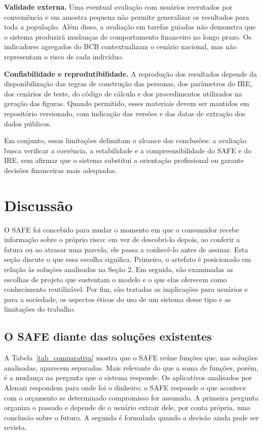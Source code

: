 \documentclass[portuguese]{sbc2025}%
\begin{document}
\textbf{Validade externa.}
Uma eventual avaliação com usuários recrutados por conveniência e
em amostra pequena não permite generalizar os resultados para toda
a população. Além disso, a avaliação em tarefas guiadas não demonstra
que o sistema produzirá mudanças de comportamento financeiro no
longo prazo. Os indicadores agregados do BCB contextualizam o cenário
nacional, mas não representam o risco de cada indivíduo.

\textbf{Confiabilidade e reprodutibilidade.}
A reprodução dos resultados depende da disponibilização das regras
de construção das personas, dos parâmetros do IRE, dos cenários de
teste, do código de cálculo e dos procedimentos utilizados na geração
das figuras. Quando permitido, esses materiais devem ser mantidos em
repositório versionado, com indicação das versões e das datas de
extração dos dados públicos.

Em conjunto, essas limitações delimitam o alcance das conclusões:
a avaliação busca verificar a coerência, a estabilidade e a
compreensibilidade do SAFE e do IRE, sem afirmar que o sistema
substitui a orientação profissional ou garante decisões financeiras
mais adequadas.

\section{Discussão}
\label{sec:discussao}

O SAFE foi concebido para mudar o momento em que o consumidor recebe informação sobre o próprio risco: em vez de descobri-lo depois, ao conferir a fatura ou ao atrasar uma parcela, ele passa a conhecê-lo antes de assinar. Esta seção discute o que essa escolha significa. Primeiro, o artefato é posicionado em relação às soluções analisadas na Seção 2. Em seguida, são examinadas as escolhas de projeto que sustentam o modelo e o que elas oferecem como conhecimento reutilizável. Por fim, são tratadas as implicações para usuários e para a sociedade, os aspectos éticos do uso de um sistema desse tipo e as limitações do trabalho.

\subsection{O SAFE diante das soluções existentes}

A Tabela~\ref{tab_comparativa} mostra que o SAFE reúne funções que, nas soluções analisadas, aparecem separadas. Mais relevante do que a soma de funções, porém, é a mudança na pergunta que o sistema responde. Os aplicativos analisados por Alenazi \citeyearpar{alenazi2026} respondem para onde foi o dinheiro; o SAFE responde o que acontece com o orçamento se determinado compromisso for assumido. A primeira pergunta organiza o passado e depende de o usuário extrair dele, por conta própria, uma conclusão sobre o futuro. A segunda é formulada quando a decisão ainda pode ser revista.
\end{document}
